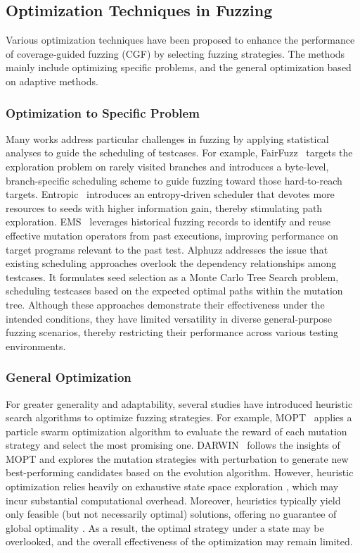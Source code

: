 \documentclass[lettersize,journal]{IEEEtran}
\begin{document}
\subsection{Optimization Techniques in Fuzzing}
Various optimization techniques have been proposed to enhance the performance of coverage‑guided fuzzing (CGF) by selecting fuzzing strategies. The methods mainly include optimizing specific problems, and the general optimization based on adaptive methods.

\subsubsection{Optimization to Specific Problem}
Many works address particular challenges in fuzzing by applying statistical analyses to guide the scheduling of testcases. For example, FairFuzz \cite{lemieuxFairFuzzTargetedMutation2018} targets the exploration problem on rarely visited branches and introduces a byte‐level, branch-specific scheduling scheme to guide fuzzing toward those hard‐to‐reach targets. Entropic \cite{bohmeBoostingFuzzerEfficiency2020} introduces an entropy‐driven scheduler that devotes more resources to seeds with higher information gain, thereby stimulating path exploration. EMS \cite{lyuEMSHistorydrivenMutation2022} leverages historical fuzzing records to identify and reuse effective mutation operators from past executions, improving performance on target programs relevant to the past test. Alphuzz \cite{zhaoAlphuzzMonteCarlo2022} addresses the issue that existing scheduling approaches overlook the dependency relationships among testcases. It formulates seed selection as a Monte Carlo Tree Search problem, scheduling testcases based on the expected optimal paths within the mutation tree. Although these approaches demonstrate their effectiveness under the intended conditions, they have limited versatility in diverse general-purpose fuzzing scenarios, thereby restricting their performance across various testing environments.

\subsubsection{General Optimization}
For greater generality and adaptability, several studies have introduced heuristic search algorithms to optimize fuzzing strategies. For example, MOPT \cite{lyuMOPTOptimizedMutation2019} applies a particle swarm optimization algorithm to evaluate the reward of each mutation strategy and select the most promising one. DARWIN \cite{jauernigDARWINSurvivalFittest2023} follows the insights of MOPT and explores the mutation strategies with perturbation to generate new best-performing candidates based on the evolution algorithm. However, heuristic optimization relies heavily on exhaustive state space exploration \cite{russellArtificialIntelligenceModern2020}, which may incur substantial computational overhead. Moreover, heuristics typically yield only feasible (but not necessarily optimal) solutions, offering no guarantee of global optimality \cite{hartFormalBasisHeuristic1968}. As a result, the optimal strategy under a state may be overlooked, and the overall effectiveness of the optimization may remain limited.
\end{document}
